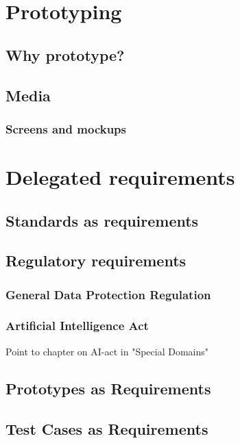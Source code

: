 \documentclass{reqengbook}
\begin{document}




\chapter{Prototyping}

\section{Why prototype?}

\section{Media}

\subsection{Screens and mockups}


\chapter{Delegated requirements}

\section{Standards as requirements}

\section{Regulatory requirements}

\subsection{General Data Protection Regulation} 

\subsection{Artificial Intelligence Act}
Point to chapter on AI-act in "Special Domains"

\section{Prototypes as Requirements}

\section{Test Cases as Requirements}
\end{document}
